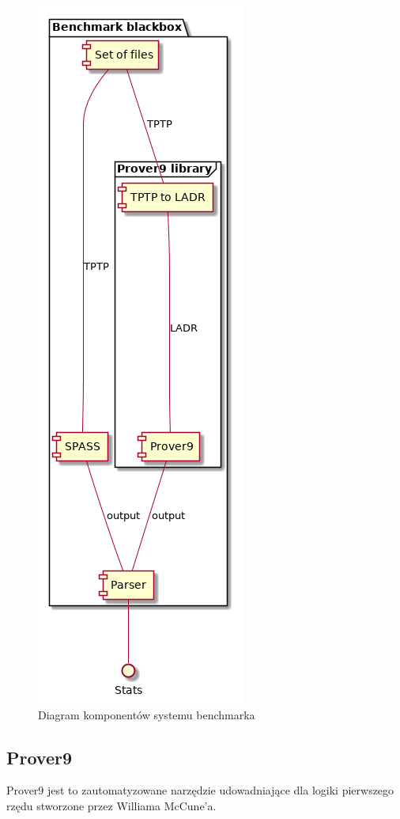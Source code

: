 \documentclass[a4paper,12pt]{article}
\begin{document}
\begin{figure}[H]
  \centering
  \includegraphics[scale=0.5]{benchmark/components.png}
  \caption{Diagram komponentów systemu benchmarka}
\end{figure}

\subsection{Prover9}

Prover9 jest to zautomatyzowane narzędzie udowadniające dla logiki pierwszego rzędu stworzone przez Williama McCune’a.
\end{document}
